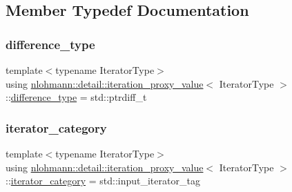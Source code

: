 \subsection{Member Typedef Documentation}
\mbox{\label{classnlohmann_1_1detail_1_1iteration__proxy__value_ada6b4e6d55d8ed7ac79e49a03e9d1fe2}} 
\subsubsection{\texorpdfstring{difference\_type}{difference\_type}}
{\footnotesize\ttfamily template$<$typename Iterator\+Type$>$ \\
using \mbox{\hyperlink{classnlohmann_1_1detail_1_1iteration__proxy__value}{nlohmann\+::detail\+::iteration\+\_\+proxy\+\_\+value}}$<$ Iterator\+Type $>$\+::\mbox{\hyperlink{classnlohmann_1_1detail_1_1iteration__proxy__value_ada6b4e6d55d8ed7ac79e49a03e9d1fe2}{difference\+\_\+type}} =  std\+::ptrdiff\+\_\+t}

\mbox{\label{classnlohmann_1_1detail_1_1iteration__proxy__value_a1ab8c44e3772c03651b5ad07216043cf}} 
\subsubsection{\texorpdfstring{iterator\_category}{iterator\_category}}
{\footnotesize\ttfamily template$<$typename Iterator\+Type$>$ \\
using \mbox{\hyperlink{classnlohmann_1_1detail_1_1iteration__proxy__value}{nlohmann\+::detail\+::iteration\+\_\+proxy\+\_\+value}}$<$ Iterator\+Type $>$\+::\mbox{\hyperlink{classnlohmann_1_1detail_1_1iteration__proxy__value_a1ab8c44e3772c03651b5ad07216043cf}{iterator\+\_\+category}} =  std\+::input\+\_\+iterator\+\_\+tag}


